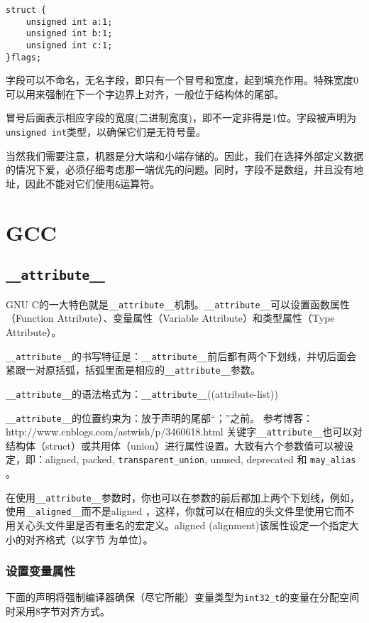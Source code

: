 \begin{verbatim}
struct {
	unsigned int a:1;
	unsigned int b:1;
	unsigned int c:1;
}flags;
\end{verbatim}
			
			字段可以不命名，无名字段，即只有一个冒号和宽度，起到填充作用。特殊宽度0可以用来强制在下一个字边界上对齐，一般位于结构体的尾部。
			
			冒号后面表示相应字段的宽度(二进制宽度)，即不一定非得是1位。字段被声明为\texttt{unsigned int}类型，以确保它们是无符号量。

			当然我们需要注意，机器是分大端和小端存储的。因此，我们在选择外部定义数据的情况下爱，必须仔细考虑那一端优先的问题。同时，字段不是数组，并且没有地址，因此不能对它们使用\texttt{&}运算符。	
	\section{GCC}
		\subsection{\texttt{__attribute__}}
			GNU C的一大特色就是\texttt{__attribute__}机制。\texttt{__attribute__}可以设置函数属性（Function Attribute）、变量属性（Variable Attribute）和类型属性（Type Attribute）。

			\texttt{__attribute__}的书写特征是：\texttt{__attribute__}前后都有两个下划线，并切后面会紧跟一对原括弧，括弧里面是相应的\texttt{__attribute__}参数。

			\texttt{__attribute__}的语法格式为：\texttt{__attribute__}((attribute-list))

			\texttt{__attribute__}的位置约束为：放于声明的尾部“；”之前。
			参考博客：http://www.cnblogs.com/astwish/p/3460618.html
			关键字\texttt{__attribute__}也可以对结构体（struct）或共用体（union）进行属性设置。大致有六个参数值可以被设定，即：aligned, packed, \texttt{transparent_union}, unused, deprecated 和 \texttt{may_alias} 。

			在使用\texttt{__attribute__}参数时，你也可以在参数的前后都加上两个下划线，例如，使用\texttt{__aligned__}而不是aligned ，这样，你就可以在相应的头文件里使用它而不用关心头文件里是否有重名的宏定义。aligned (alignment)该属性设定一个指定大小的对齐格式（以字节 为单位）。		

			\subsubsection{设置变量属性}
				下面的声明将强制编译器确保（尽它所能）变量类型为\texttt{int32_t}的变量在分配空间时采用8字节对齐方式。

